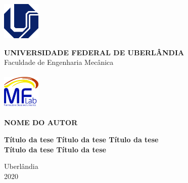 \begin{titlepage}
	\begin{center}
		\begin{minipage}{2.0cm}
			\begin{center}
				\includegraphics[width=1.8cm,height=1.8cm]{prefiles/ufu.pdf}	
			\end{center}
		\end{minipage}\hfill
		\begin{minipage}{11.0cm}
			\begin{center}
				\large{\textbf{ UNIVERSIDADE FEDERAL DE UBERLÂNDIA}}\\[0.1cm]
				\large{Faculdade de Engenharia Mecânica}\\[0.1cm]
			\end{center}
		\end{minipage}\hfill
		\begin{minipage}{2.0cm}
			\begin{center}
				\includegraphics[width=1.8cm,height=1.8cm]{prefiles/mflab.pdf}
			\end{center}
		\end{minipage}
		
		\vspace*{4cm}
		
		\textbf{NOME DO AUTOR}
		
		\vspace{4.5cm}
		{\fontsize{23}{23} \textbf{Título da tese Título da tese Título da tese}}	\\ \vspace{1.2ex}
		{\fontsize{23}{23} \textbf{Título da tese Título da tese}}\\ \vspace{1.2ex}
		
		\vspace*{11.2cm}
		Uberlândia\\2020
		
	\end{center}
\end{titlepage}
